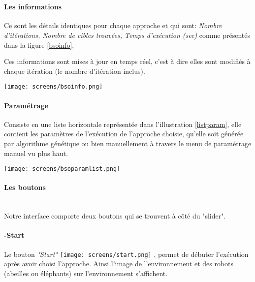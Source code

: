 \textbf{ }\\

\noindent
\begin{minipage}{0.6\textwidth}
\paragraph{Les informations}
Ce sont les détails identiques pour chaque approche et qui sont:
\textit{Nombre d'itérations, Nombre de cibles trouvées, Temps d'exécution (sec)} comme présentés dans la figure \ref{bsoinfo}.

Ces informations sont mises à jour en temps réel, c'est à dire elles sont modifiés à chaque itération (le nombre d'itération inclus).
\end{minipage}
\begin{minipage}{0.4\textwidth}
	\captionsetup{width=0.7\linewidth}
	\centering
	\texttt{[image: screens/bsoinfo.png]}%
	\vspace{-0.1 cm}
	\label{bsoinfo}%
\end{minipage}





\paragraph{Paramétrage}
Consiste en une liste horizontale représentée dans l'illustration \ref{listparam}, elle contient les paramètres de l'exécution de l'approche choisie, qu'elle soit générée par algorithme génétique ou bien manuellement à travers le menu de paramétrage manuel vu plus haut.


\begin{center}	  
	\captionsetup{width=1\linewidth}
	\texttt{[image: screens/bsoparamlist.png]}%
	\vspace{-0.1 cm}
	\label{listparam}%
\end{center}


\paragraph{Les boutons}
\textbf{ }\\
Notre interface comporte deux boutons qui se trouvent à côté du "slider".
\paragraph{-Start}
Le bouton \textit{"Start"} \texttt{[image: screens/start.png]} , permet de débuter l'exécution après avoir choisi l'approche.
Ainsi l'image de l'environnement et des robots (abeilles ou éléphants) sur l'environnement s'affichent.


